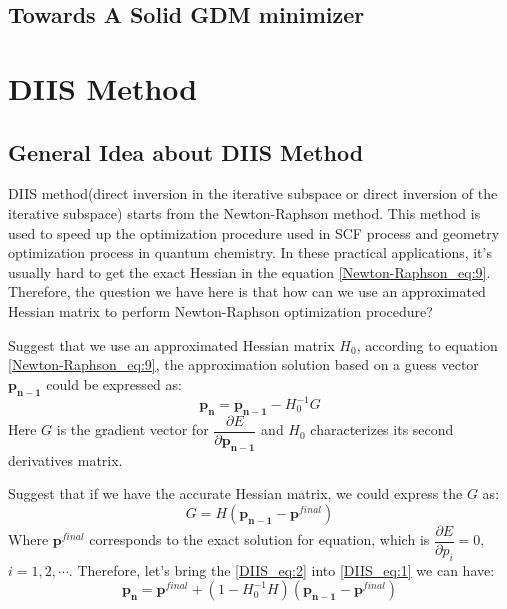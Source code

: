 \subsection{Towards A Solid GDM minimizer}
%
%
%



\section{DIIS Method}
%
%
%
\subsection{General Idea about DIIS Method}
%
%
%
DIIS method(direct inversion in the iterative subspace or direct inversion of the iterative subspace)
\cite{Pulay1980393, JCC:JCC540030413} starts from the Newton-Raphson method. This method is used to
speed up the optimization procedure used in SCF process and geometry optimization process in quantum
chemistry. In these practical applications, it's usually hard to get the exact Hessian in the 
equation \ref{Newton-Raphson_eq:9}. Therefore, the question we have here is that how can we use an 
approximated Hessian matrix to perform Newton-Raphson optimization procedure?

Suggest that we use an approximated Hessian matrix $H_{0}$, according to equation
\ref{Newton-Raphson_eq:9}, the approximation solution based on a guess vector $\mathbf{p_{n-1}}$ 
could be expressed as:
\begin{equation}
\label{DIIS_eq:1}
 \mathbf{p_{n}} = \mathbf{p_{n-1}} - H_{0}^{-1}G
\end{equation}
Here $G$ is the gradient vector for $\dfrac{\partial E}{\partial \mathbf{p_{n-1}}}$ and 
$H_{0}$ characterizes its second derivatives matrix.

Suggest that if we have the accurate Hessian matrix, we could express the $G$ as:
\begin{equation}
\label{DIIS_eq:2}
 G = H(\mathbf{p_{n-1}} - \mathbf{p}^{final})
\end{equation}
Where $\mathbf{p}^{final}$ corresponds to the exact solution for equation, which is 
$\dfrac{\partial E}{\partial p_{i}} = 0$, $i = 1, 2, \cdots$. 
Therefore, let's bring the \ref{DIIS_eq:2} into \ref{DIIS_eq:1} we can have:
\begin{equation}
 \label{DIIS_eq:3}
 \mathbf{p_{n}} = \mathbf{p}^{final} + (1-H_{0}^{-1}H)(\mathbf{p_{n-1}} - \mathbf{p}^{final})
\end{equation}

